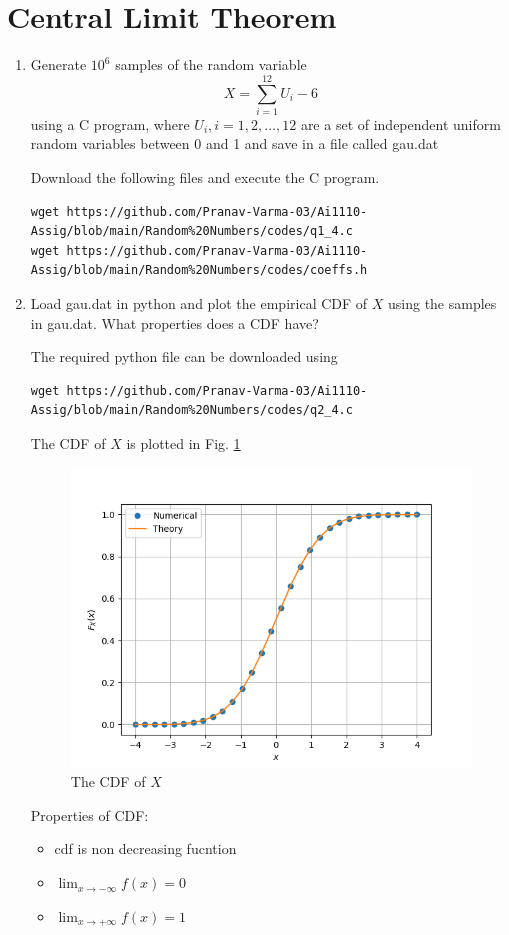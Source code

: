 \documentclass[journal,12pt,twocolumn]{IEEEtran}
\renewcommand\thesection{\arabic{section}}
\begin{document}
\section{Central Limit Theorem}
%
%
\begin{enumerate}[label=\textbf{\thesection.\arabic*},ref=\thesection.\theenumi]
\item
Generate $10^6$ samples of the random variable
%
\begin{equation}
X = \sum_{i=1}^{12}U_i -6
\end{equation}
%
using a C program, where $U_i, i = 1,2,\dots, 12$ are  a set of independent uniform random variables between 0 and 1
and save in a file called gau.dat

\solution Download the following files and execute the  C program.
\begin{lstlisting}
wget https://github.com/Pranav-Varma-03/Ai1110-Assig/blob/main/Random%20Numbers/codes/q1_4.c
wget https://github.com/Pranav-Varma-03/Ai1110-Assig/blob/main/Random%20Numbers/codes/coeffs.h
\end{lstlisting}
%
\item
Load gau.dat in python and plot the empirical CDF of $X$ using the samples in gau.dat. What properties does a CDF have?

\solution The required python file can be downloaded using
\begin{lstlisting}
wget https://github.com/Pranav-Varma-03/Ai1110-Assig/blob/main/Random%20Numbers/codes/q2_4.c
\end{lstlisting}
The CDF of $X$ is plotted in Fig. \ref{fig:gauss_cdf}
\begin{figure}[!ht]
\centering
\includegraphics[width=\columnwidth]{figs/cdf_plot_gau.png}
\caption{The CDF of $X$}
\label{fig:gauss_cdf}
\end{figure}
Properties of CDF:
\begin{itemize}
    \item cdf is non decreasing fucntion
    \item $\lim_{x \to -\infty} f(x) = 0$
    \item $\lim_{x \to +\infty} f(x) = 1$
\end{itemize}
%



\end{enumerate}
\end{document}
